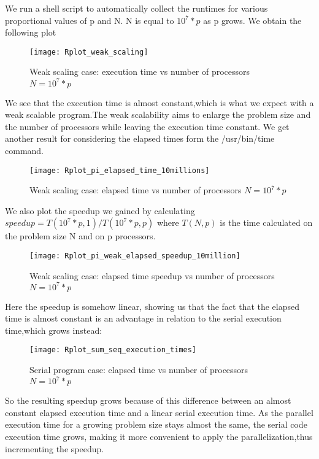 \documentclass[11pt]{scrartcl} %
\begin{document}
We run a shell script to automatically collect the runtimes for various proportional values of p and N. 
N is equal to $10^7*p$ as p grows.
We obtain the following plot
\begin{figure}[H] %
	\centering
	\texttt{[image: Rplot\_weak\_scaling]} %
	\caption{Weak scaling case: execution time vs number of processors $N= 10^7*p$}
\end{figure}
We see that the execution time is almost constant,which is what we expect with a weak scalable program.The weak scalability aims to enlarge the problem size and the number of processors while leaving the execution time constant.
We get another result for considering the elapsed times form the /usr/bin/time command.
\begin{figure}[H] %
	\centering
	\texttt{[image: Rplot\_pi\_elapsed\_time\_10millions]} %
	\caption{Weak scaling case: elapsed time vs number of processors $N= 10^7*p$}
\end{figure}
We also plot the speedup we gained by calculating $speedup = T(10^7*p,1)/T(10^7*p,p)$ where $T(N,p)$ is the time calculated on the problem size N and on p processors.
\begin{figure}[H] %
	\centering
	\texttt{[image: Rplot\_pi\_weak\_elapsed\_speedup\_10million]} %
	\caption{Weak scaling case: elapsed time speedup vs number of processors $N= 10^7*p$}
\end{figure}
Here the speedup is somehow linear, showing us that the fact that the elapsed time is almost constant is an advantage in relation to the serial execution time,which grows instead:
\begin{figure}[H] %
	\centering
	\texttt{[image: Rplot\_sum\_seq\_execution\_times]} %
	\caption{Serial program case: elapsed time vs number of processors $N= 10^7*p$}
\end{figure}
So the resulting speedup grows because of this difference between an almost constant elapsed execution time and a linear serial execution time. As the parallel execution time for a growing problem size stays almost the same, the serial code execution time grows, making it more convenient to apply the parallelization,thus incrementing the speedup.
\end{document}
